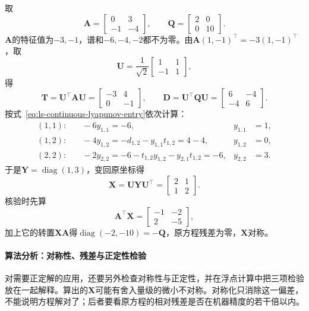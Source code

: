 \begin{example}[连续型方程的Schur求解]
\label{ex:ls-continuous-lyapunov-schur}
取
\[
 \bm A=\begin{bmatrix}0&3\\-1&-4\end{bmatrix},\qquad
 \bm Q=\begin{bmatrix}2&0\\0&10\end{bmatrix}.
\]
$\bm A$的特征值为$-3,-1$，谱和$-6,-4,-2$都不为零。由$\bm A(1,-1)^\top=-3(1,-1)^\top$，取
\[
 \bm U=\frac1{\sqrt2}\begin{bmatrix}1&1\\-1&1\end{bmatrix},
\]
得
\[
 \bm T=\bm U^\top\bm A\bm U=\begin{bmatrix}-3&4\\0&-1\end{bmatrix},\qquad
 \bm D=\bm U^\top\bm Q\bm U=\begin{bmatrix}6&-4\\-4&6\end{bmatrix}.
\]
按式~\eqref{eq:ls-continuous-lyapunov-entry}依次计算：
\[
 \begin{aligned}
 (1,1):&\quad -6y_{1,1}=-6, & y_{1,1}&=1,\\
 (1,2):&\quad -4y_{1,2}=-d_{1,2}-y_{1,1}t_{1,2}=4-4, & y_{1,2}&=0,\\
 (2,2):&\quad -2y_{2,2}=-6-t_{1,2}y_{1,2}-y_{2,1}t_{1,2}=-6, & y_{2,2}&=3 .
 \end{aligned}
\]
于是$\bm Y=\operatorname{diag}(1,3)$，变回原坐标得
\[
 \bm X=\bm U\bm Y\bm U^\top=\begin{bmatrix}2&1\\1&2\end{bmatrix}.
\]
核验时先算
\[
 \bm A^\top\bm X=\begin{bmatrix}-1&-2\\2&-5\end{bmatrix},
\]
加上它的转置$\bm X\bm A$得$\operatorname{diag}(-2,-10)=-\bm Q$，原方程残差为零，$\bm X$对称。
\end{example}

\paragraph{算法分析：对称性、残差与正定性检验}
对需要正定解的应用，还要另外检查对称性与正定性，并在浮点计算中把三项检验放在一起解释。算出的$\bm X$可能有舍入量级的微小不对称。对称化只消除这一偏差，不能说明方程解对了；后者要看原方程的相对残差是否在机器精度的若干倍以内。

